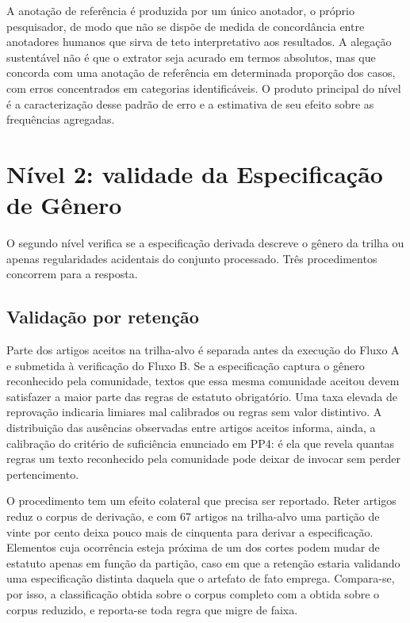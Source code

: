 A anotação de referência é produzida por um único anotador, o próprio pesquisador, de modo que não se dispõe de medida de concordância entre anotadores humanos que sirva de teto interpretativo aos resultados. A alegação sustentável não é que o extrator seja acurado em termos absolutos, mas que concorda com uma anotação de referência em determinada proporção dos casos, com erros concentrados em categorias identificáveis. O produto principal do nível é a caracterização desse padrão de erro e a estimativa de seu efeito sobre as frequências agregadas.


\section{Nível 2: validade da Especificação de Gênero}
\label{sec:nivel2}

O segundo nível verifica se a especificação derivada descreve o gênero da trilha ou apenas regularidades acidentais do conjunto processado. Três procedimentos concorrem para a resposta.

\subsection*{Validação por retenção}

Parte dos artigos aceitos na trilha-alvo é separada antes da execução do Fluxo A e submetida à verificação do Fluxo B. Se a especificação captura o gênero reconhecido pela comunidade, textos que essa mesma comunidade aceitou devem satisfazer a maior parte das regras de estatuto obrigatório. Uma taxa elevada de reprovação indicaria limiares mal calibrados ou regras sem valor distintivo. A distribuição das ausências observadas entre artigos aceitos informa, ainda, a calibração do critério de suficiência enunciado em PP4: é ela que revela quantas regras um texto reconhecido pela comunidade pode deixar de invocar sem perder pertencimento.

O procedimento tem um efeito colateral que precisa ser reportado. Reter artigos reduz o corpus de derivação, e com 67 artigos na trilha-alvo uma partição de vinte por cento deixa pouco mais de cinquenta para derivar a especificação. Elementos cuja ocorrência esteja próxima de um dos cortes podem mudar de estatuto apenas em função da partição, caso em que a retenção estaria validando uma especificação distinta daquela que o artefato de fato emprega. Compara-se, por isso, a classificação obtida sobre o corpus completo com a obtida sobre o corpus reduzido, e reporta-se toda regra que migre de faixa.

